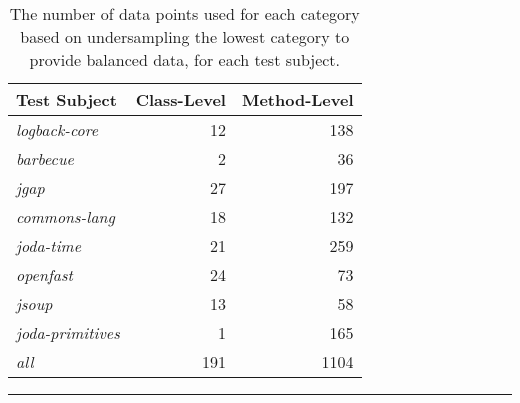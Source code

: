 \begin{table}[!tb]
  \centering
  \begin{threeparttable}
    \begin{tabular}{|l|r|r|}
      \rowcolor[RGB]{169,196,223}
      \hline \textbf{Test Subject} & \textbf{Class-Level} & \textbf{Method-Level} \\
      \hline \emph{logback-core} & 12 & 138 \\
      \hline \emph{barbecue} & 2 & 36 \\
      \hline \emph{jgap} & 27 & 197 \\
      \hline \emph{commons-lang} & 18 & 132 \\
      \hline \emph{joda-time} & 21 & 259 \\
      \hline \emph{openfast} & 24 & 73 \\
      \hline \emph{jsoup} & 13 & 58 \\
      \hline \emph{joda-primitives} & 1 & 165 \\
      \hline \emph{all} & 191 & 1104 \\
      \hline
    \end{tabular}
  \end{threeparttable}
  \caption{The number of data points used for each category based on undersampling the lowest category to provide balanced data, for each test subject.}
  \vspace{2mm}
  \hrule
  \label{tab:experiments_undersampled_data}
\end{table}

